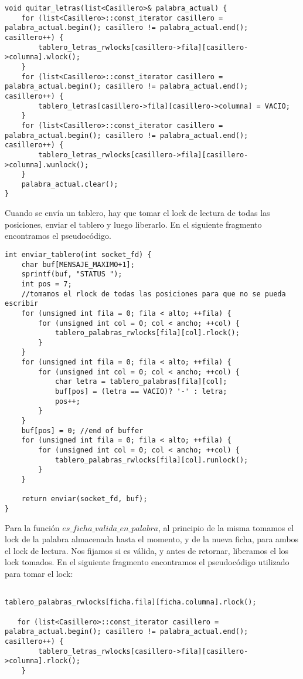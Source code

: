 \begin{lstlisting}
void quitar_letras(list<Casillero>& palabra_actual) {
    for (list<Casillero>::const_iterator casillero = palabra_actual.begin(); casillero != palabra_actual.end(); casillero++) {
        tablero_letras_rwlocks[casillero->fila][casillero->columna].wlock();
    }
    for (list<Casillero>::const_iterator casillero = palabra_actual.begin(); casillero != palabra_actual.end(); casillero++) {
        tablero_letras[casillero->fila][casillero->columna] = VACIO;
    }
    for (list<Casillero>::const_iterator casillero = palabra_actual.begin(); casillero != palabra_actual.end(); casillero++) {
        tablero_letras_rwlocks[casillero->fila][casillero->columna].wunlock();
    }
    palabra_actual.clear();
}
\end{lstlisting}

Cuando se envía un tablero, hay que tomar el lock de lectura de todas las posiciones, enviar el tablero y luego liberarlo. En el siguiente fragmento encontramos el pseudocódigo.

\begin{lstlisting}
int enviar_tablero(int socket_fd) {
    char buf[MENSAJE_MAXIMO+1];
    sprintf(buf, "STATUS ");
    int pos = 7;
    //tomamos el rlock de todas las posiciones para que no se pueda escribir
    for (unsigned int fila = 0; fila < alto; ++fila) {
        for (unsigned int col = 0; col < ancho; ++col) {
            tablero_palabras_rwlocks[fila][col].rlock();
        }
    }
    for (unsigned int fila = 0; fila < alto; ++fila) {
        for (unsigned int col = 0; col < ancho; ++col) {
            char letra = tablero_palabras[fila][col];
            buf[pos] = (letra == VACIO)? '-' : letra;
            pos++;
        }
    }
    buf[pos] = 0; //end of buffer
    for (unsigned int fila = 0; fila < alto; ++fila) {
        for (unsigned int col = 0; col < ancho; ++col) {
            tablero_palabras_rwlocks[fila][col].runlock();
        }
    }

    return enviar(socket_fd, buf);
}
\end{lstlisting}

Para la función $ es\_ficha\_valida\_en\_palabra $, al principio de la misma tomamos el lock de la palabra almacenada hasta el momento, y de la nueva ficha, para ambos el lock de lectura. Nos fijamos si es válida, y antes de retornar, liberamos el los lock tomados. En el siguiente fragmento encontramos el pseudocódigo utilizado para tomar el lock:

\begin{lstlisting}

tablero_palabras_rwlocks[ficha.fila][ficha.columna].rlock();

   for (list<Casillero>::const_iterator casillero = palabra_actual.begin(); casillero != palabra_actual.end(); casillero++) {
        tablero_letras_rwlocks[casillero->fila][casillero->columna].rlock();
    }

\end{lstlisting}


